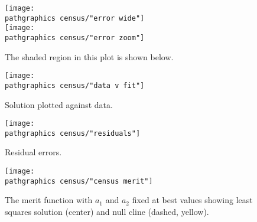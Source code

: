    \begin{figure}[t]
    	\texttt{[image: \\pathgraphics census/"error wide"]} \\[20pt]
    	\texttt{[image: \\pathgraphics census/"error zoom"]}
    	\caption{The shaded region in this plot is shown below.}
    \end{figure}
    \begin{figure}[t]
    	\texttt{[image: \\pathgraphics census/"data v fit"]}
    	\caption{Solution plotted against data.}
    \end{figure}
    \begin{figure}[t]
    	\texttt{[image: \\pathgraphics census/"residuals"]}
    	\caption{Residual errors.}
    \end{figure}
    \begin{figure}[t]
      \texttt{[image: \\pathgraphics census/"census merit"]}
      \caption[The merit function showing least squares solution]{The merit function with $a_{1}$ and $a_{2}$ fixed at best values showing least squares solution (center) and null cline (dashed, yellow).}
    \end{figure}


